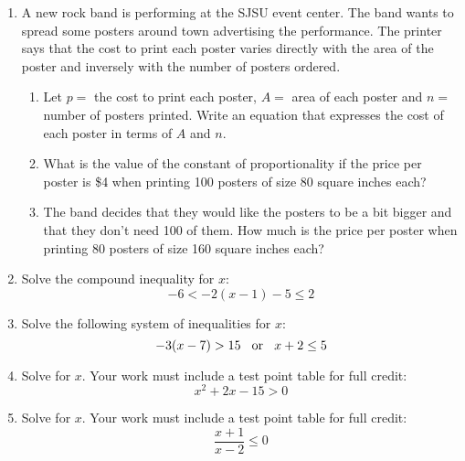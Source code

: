 \documentclass[letterpaper,12pt,fleqn]{article}
\begin{document}
\begin{enumerate}
\item A new rock band is performing at the SJSU event center. The band wants to spread
  some posters around town advertising the performance. The printer says that the cost
  to print each poster varies directly with the area of the poster and inversely with
  the number of posters ordered.
  \begin{enumerate}
  \item Let $p=$ the cost to print each poster, $A=$ area of each poster and $n=$ number
    of posters printed. Write an equation that expresses the cost of each poster in terms
    of $A$ and $n$.

    \vspace{1in}

  \item What is the value of the constant of proportionality if the price per poster is
    \$4 when printing 100 posters of size 80 square inches each?

    \vspace{1.25in}

  \item The band decides that they would like the posters to be a bit bigger and that
    they don't need 100 of them. How much is the price per poster when printing 80
    posters of size 160 square inches each?
  \end{enumerate}

  \newpage

\item Solve the compound inequality for $x$:
  \[-6<-2(x-1)-5\le2\]

  \vspace{3in}

\item Solve the following system of inequalities for $x$:
  \[-3(x-7)>15\hspace{2ex}\mbox{or}\hspace{2ex}x+2\le5\]

  \newpage

\item Solve for $x$. Your work must include a test point table for full credit:
  \[x^2+2x-15>0\]

  \vspace{3in}

\item Solve for $x$. Your work must include a test point table for full credit:
  \[\frac{x+1}{x-2}\le0\]


\end{enumerate}
\end{document}

